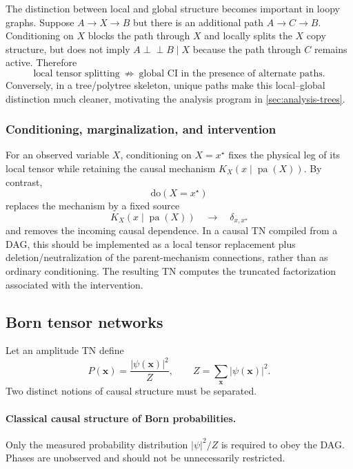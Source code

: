 \documentclass[11pt]{article}
\theoremstyle{remark}
\newcommand{\indep}{\perp\!\!\!\perp}
\newcommand{\pa}{\operatorname{pa}}
\begin{document}
The distinction between local and global structure becomes important in loopy graphs. Suppose $A\to X\to B$ but there is an additional path $A\to C\to B$. Conditioning on $X$ blocks the path through $X$ and locally splits the $X$ copy structure, but does not imply $A\indep B\mid X$ because the path through $C$ remains active. Therefore
\begin{equation}
\boxed{\text{local tensor splitting}\ \not\Rightarrow\ \text{global CI in the presence of alternate paths}.}
\end{equation}
Conversely, in a tree/polytree skeleton, unique paths make this local--global distinction much cleaner, motivating the analysis program in \cref{sec:analysis-trees}.

\subsubsection{Conditioning, marginalization, and intervention}
\label{sec:interventions-foundation}

For an observed variable $X$, conditioning on $X=x^\star$ fixes the physical leg of its local tensor while retaining the causal mechanism $K_X(x\mid\pa(X))$. By contrast,
\begin{equation}
\mathrm{do}(X=x^\star)
\end{equation}
replaces the mechanism by a fixed source
\begin{equation}
K_X(x\mid\pa(X))\quad\longrightarrow\quad \delta_{x,x^\star}
\end{equation}
and removes the incoming causal dependence. In a causal TN compiled from a DAG, this should be implemented as a local tensor replacement plus deletion/neutralization of the parent-mechanism connections, rather than as ordinary conditioning. The resulting TN computes the truncated factorization associated with the intervention.

\subsection{Born tensor networks}
\label{sec:born}

Let an amplitude TN define
\begin{equation}
P(\bm x)=\frac{|\psi(\bm x)|^2}{Z},\qquad Z=\sum_{\bm x}|\psi(\bm x)|^2.
\end{equation}
Two distinct notions of causal structure must be separated.

\paragraph{Classical causal structure of Born probabilities.}
Only the measured probability distribution $|\psi|^2/Z$ is required to obey the DAG. Phases are unobserved and should not be unnecessarily restricted.
\end{document}
